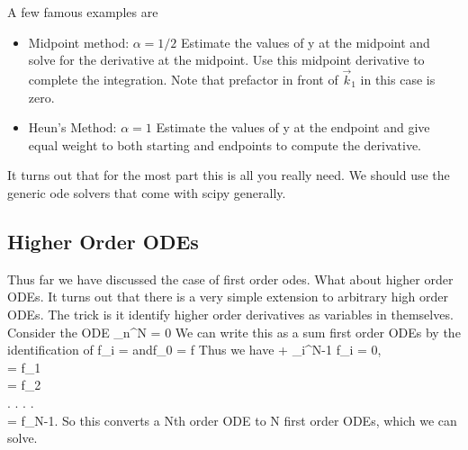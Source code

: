 A few famous examples are 
\begin{itemize}
    \item Midpoint method: $\alpha = 1/2$ Estimate the values of y at the midpoint and solve for the derivative at the midpoint.  Use this midpoint derivative to complete the integration.  Note that prefactor in front of $\vec{k}_1$ in this case is zero.
    \item Heun's Method: $\alpha = 1$ Estimate the values of y at the endpoint and give equal weight to both starting and endpoints to compute the derivative.
\end{itemize}

It turns out that for the most part this is all you really need.  We should use the generic ode solvers that come with scipy generally. 

\subsection{Higher Order ODEs}

Thus far we have discussed the case of first order odes.  What about higher order ODEs.  It turns out that there is a very simple extension to arbitrary high order ODEs.  The trick is it identify higher order derivatives as variables in themselves.  Consider the ODE
\be
\sum_n^N = 0
\ee
We can write this as a sum first order ODEs by the identification of 
\be
f_i =  \qquad\textrm{and}\qquad f_0 = f
\ee
Thus we have 
\be
{} + \sum_i^{N-1} f_i = 0,\\
 = f_1\\
 = f_2\\
 . . . . \\
 = f_{N-1}.
\ee
So this converts a Nth order ODE to N first order ODEs, which we can solve.

